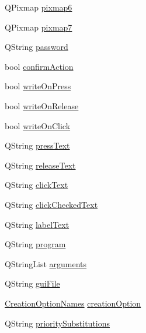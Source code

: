 \begin{DoxyCompactItemize}
\item 
QPixmap \hyperlink{classQEPushButton_a8fcaaa8f5e05c36feb340da2f9661dc5}{pixmap6}
\item 
QPixmap \hyperlink{classQEPushButton_a4d04d0e65d8128bb377469261647b436}{pixmap7}
\item 
QString \hyperlink{classQEPushButton_ae64440ff4fbd449726f83c302be8f12a}{password}
\item 
bool \hyperlink{classQEPushButton_a349efcfb5c1e1a306e4a4b8d90c63966}{confirmAction}
\item 
bool \hyperlink{classQEPushButton_af37cf41a4f30095f42aa39a5bda5f4b1}{writeOnPress}
\item 
bool \hyperlink{classQEPushButton_a552f3699d0798cbe9233ff81947d6d7f}{writeOnRelease}
\item 
bool \hyperlink{classQEPushButton_a728ad7d31319f5f82548cd7d1bc65803}{writeOnClick}
\item 
QString \hyperlink{classQEPushButton_a8a9405380dd087993785efcc351cefe5}{pressText}
\item 
QString \hyperlink{classQEPushButton_a1f08055d333a9899ccaffc3574d38d02}{releaseText}
\item 
QString \hyperlink{classQEPushButton_a0c71a9b133e4452dcfef961becf55fba}{clickText}
\item 
QString \hyperlink{classQEPushButton_a6dfe1f7842d84c9b8ea19f43346be73f}{clickCheckedText}
\item 
QString \hyperlink{classQEPushButton_ac6a77971fd82a22ded755ac39533877e}{labelText}
\item 
QString \hyperlink{classQEPushButton_ab038376ec0c330b1aba8c23d82e2f263}{program}
\item 
QStringList \hyperlink{classQEPushButton_ae25b176db2b427089e1b1532a3c3ce52}{arguments}
\item 
QString \hyperlink{classQEPushButton_a463afceced7f64ea2f738a69e9db425b}{guiFile}
\item 
\hyperlink{classQEPushButton_a739432b8d095d67512aae5d81fcea094}{CreationOptionNames} \hyperlink{classQEPushButton_a195284f5eb958b4caaf05c848f12ccf1}{creationOption}
\item 
QString \hyperlink{classQEPushButton_af37f9c3f00647a65d0765bdebe3f228a}{prioritySubstitutions}
\end{DoxyCompactItemize}


